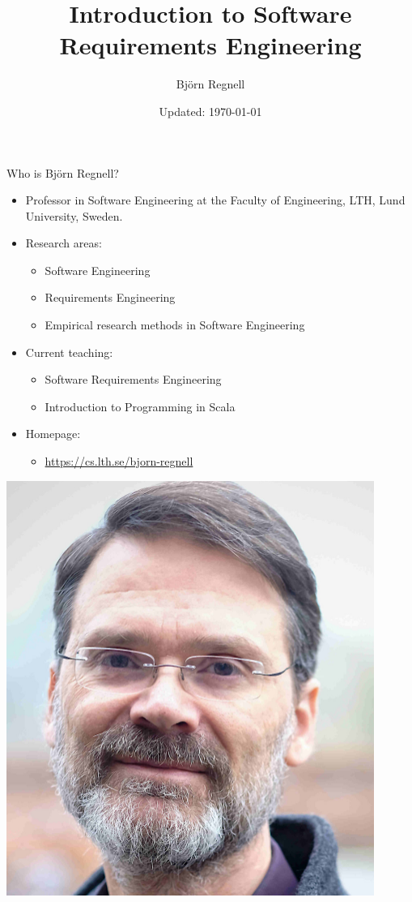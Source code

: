 \documentclass{beamer}
\author{Björn Regnell}
\title{Introduction to Software\\Requirements Engineering}
\date{\footnotesize Updated: \today}
\begin{document}
\maketitle

\begin{frame}[fragile]{Who is Björn Regnell?}
\begin{minipage}[t][1.0\textheight]{0.78\textwidth}
\vspace{0pt}
\begin{itemize}
\item Professor in Software Engineering at the Faculty of Engineering, LTH, Lund University, Sweden.
\item Research areas: 
\begin{itemize}
\item Software Engineering
\item Requirements Engineering 
\item Empirical research methods in Software Engineering 
\end{itemize}
\item Current teaching: 
\begin{itemize}
\item Software Requirements Engineering
\item Introduction to Programming in Scala 
\end{itemize}
\item Homepage: 
\begin{itemize}
\item \url{https://cs.lth.se/bjorn-regnell}
\end{itemize}
\end{itemize}
\end{minipage}%
\hspace*{1em}\begin{minipage}[t][1.0\textheight]{0.22\textwidth}
\vspace{0pt}\hfill\includegraphics[width=0.9\textwidth]{img/bjorn-regnell}
\end{minipage}%
\end{frame}
\end{document}
